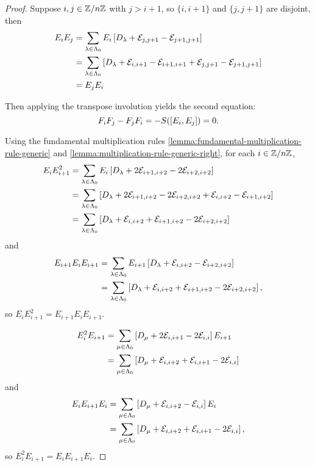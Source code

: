 \documentclass[a4paper, 11pt, twoside]{report}
\begin{document}
\begin{proof}
Suppose $i,j\in\mathbb{Z}/{n \mathbb{Z}}$ with $j>i+1$, so $\{i,i+1\}$ and $\{j,j+1\}$ are disjoint, then
\begin{align*}
E_iE_j &= \sum_{\lambda\in\Lambda_0{}} E_i\left[ D_{\lambda}+\mathcal{E}_{j,j+1}-\mathcal{E}_{j+1,j+1}\right]\\
&= \sum_{\lambda\in\Lambda_0{}} \left[ D_{\lambda}+\mathcal{E}_{i,i+1}-\mathcal{E}_{i+1,i+1}+\mathcal{E}_{j,j+1}-\mathcal{E}_{j+1,j+1}\right]\\
&= E_jE_i
\end{align*}

Then applying the transpose involution yields the second equation:
\begin{equation*}
F_iF_j-F_jF_i = -S{(\left[E_i,E_j\right])} = 0.
\end{equation*}

Using the fundamental multiplication rules \ref{lemma:fundamental-multiplication-rule-generic} and \ref{lemma:multiplication-rule-generic-right}, for each $i\in\mathbb{Z}/{n \mathbb{Z}}$,
\begin{align*}
E_iE_{i+1}^2 &= \sum_{\lambda\in\Lambda_0{}} E_i\left[D_{\lambda} +2\mathcal{E}_{i+1,i+2} -2\mathcal{E}_{i+2,i+2}\right]\\
&= \sum_{\lambda\in\Lambda_0{}} \left[D_{\lambda} +2\mathcal{E}_{i+1,i+2} -2\mathcal{E}_{i+2,i+2} +\mathcal{E}_{i,i+2} -\mathcal{E}_{i+1,i+2}\right]\\
&= \sum_{\lambda\in\Lambda_0{}} \left[D_{\lambda} +\mathcal{E}_{i,i+2} +\mathcal{E}_{i+1,i+2} -2\mathcal{E}_{i+2,i+2}\right]
\end{align*}
and
\begin{align*}
E_{i+1}E_iE_{i+1} &= \sum_{\lambda\in\Lambda_0{}} E_{i+1}\left[D_{\lambda} +\mathcal{E}_{i,i+2}-\mathcal{E}_{i+2,i+2}\right]\\
&= \sum_{\lambda\in\Lambda_0{}} \left[D_{\lambda}+\mathcal{E}_{i,i+2}+\mathcal{E}_{i+1,i+2}-2\mathcal{E}_{i+2,i+2}\right],
\end{align*}
so $E_iE_{i+1}^2 = E_{i+1}E_iE_{i+1}$.

\begin{align*}
E_i^2E_{i+1} &= \sum_{\mu\in\Lambda_0{}} \left[D_{\mu}+2\mathcal{E}_{i,i+1}-2\mathcal{E}_{i,i}\right]E_{i+1}\\
&= \sum_{\mu\in\Lambda_0{}} \left[D_{\mu}+\mathcal{E}_{i,i+2}+\mathcal{E}_{i,i+1}-2\mathcal{E}_{i,i}\right]
\end{align*}
and
\begin{align*}
E_iE_{i+1}E_i &= \sum_{\mu\in\Lambda_0{}} \left[D_{\mu}+\mathcal{E}_{i,i+2}-\mathcal{E}_{i,i}\right]E_i\\
&= \sum_{\mu\in\Lambda_0{}} \left[D_{\mu}+\mathcal{E}_{i,i+2}+\mathcal{E}_{i,i+1}-2\mathcal{E}_{i,i}\right],
\end{align*}
so $E_i^2E_{i+1}=E_iE_{i+1}E_i$.


\end{proof}
\end{document}
